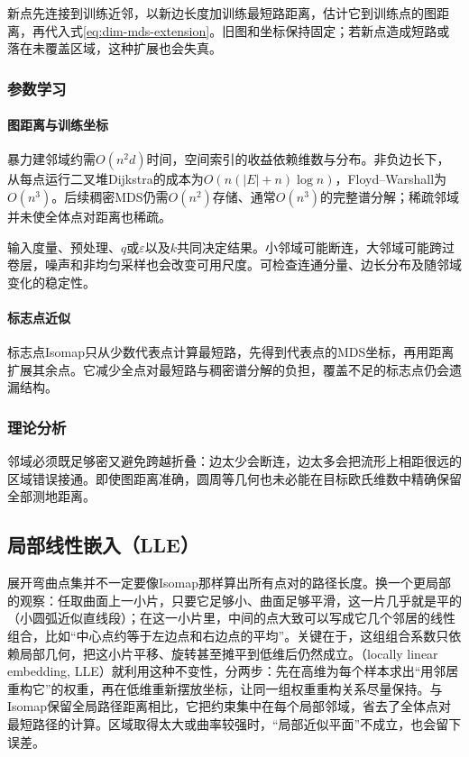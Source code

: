 新点先连接到训练近邻，以新边长度加训练最短路距离，估计它到训练点的图距离，再代入式\eqref{eq:dim-mds-extension}。旧图和坐标保持固定；若新点造成短路或落在未覆盖区域，这种扩展也会失真。

\subsubsection{参数学习}

\paragraph{图距离与训练坐标}

暴力建邻域约需$O(n^2d)$时间，空间索引的收益依赖维数与分布。非负边长下，从每点运行二叉堆Dijkstra的成本为$O(n(|E|+n)\log n)$，Floyd--Warshall为$O(n^3)$。后续稠密MDS仍需$O(n^2)$存储、通常$O(n^3)$的完整谱分解；稀疏邻域并未使全体点对距离也稀疏。

输入度量、预处理、$q$或$\varepsilon$以及$k$共同决定结果。小邻域可能断连，大邻域可能跨过卷层，噪声和非均匀采样也会改变可用尺度。可检查连通分量、边长分布及随邻域变化的稳定性。

\paragraph{标志点近似}

标志点Isomap只从少数代表点计算最短路，先得到代表点的MDS坐标，再用距离扩展其余点。它减少全点对最短路与稠密谱分解的负担，覆盖不足的标志点仍会遗漏结构。

\subsubsection{理论分析}

邻域必须既足够密又避免跨越折叠：边太少会断连，边太多会把流形上相距很远的区域错误接通。即使图距离准确，圆周等几何也未必能在目标欧氏维数中精确保留全部测地距离。

\subsection{局部线性嵌入（LLE）}
\label{sec:dim-lle}

展开弯曲点集并不一定要像Isomap那样算出所有点对的路径长度。换一个更局部的观察：任取曲面上一小片，只要它足够小、曲面足够平滑，这一片几乎就是平的（小圆弧近似直线段）；在这一小片里，中间的点大致可以写成它几个邻居的线性组合，比如“中心点约等于左边点和右边点的平均”。关键在于，这组组合系数只依赖局部几何，把这小片平移、旋转甚至摊平到低维后仍然成立。（locally linear embedding, LLE）就利用这种不变性，分两步：先在高维为每个样本求出“用邻居重构它”的权重，再在低维重新摆放坐标，让同一组权重重构关系尽量保持。与Isomap保留全局路径距离相比，它把约束集中在每个局部邻域，省去了全体点对最短路径的计算。区域取得太大或曲率较强时，“局部近似平面”不成立，也会留下误差。

